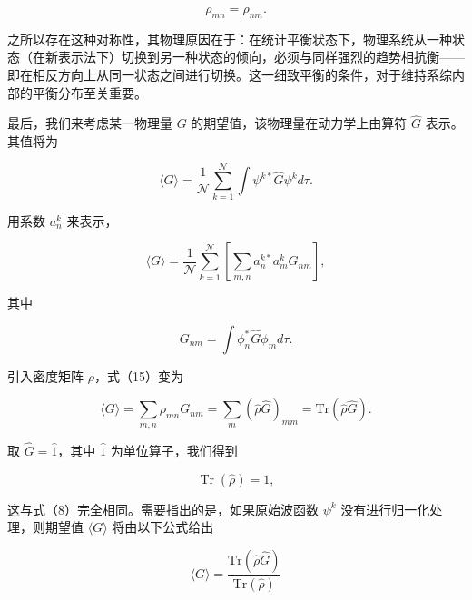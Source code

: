 \begin{equation}\tag{5.1.14}\label{eq:5.1.14}
\rho _ { m n } = \rho _ { n m } .
\end{equation}

之所以存在这种对称性，其物理原因在于：在统计平衡状态下，物理系统从一种状态（在新表示法下）切换到另一种状态的倾向，必须与同样强烈的趋势相抗衡------即在相反方向上从同一状态之间进行切换。这一细致平衡的条件，对于维持系综内部的平衡分布至关重要。

最后，我们来考虑某一物理量 \(G\) 的期望值，该物理量在动力学上由算符 \(\hat{G}\) 表示。其值将为

\begin{equation}\tag{5.1.15}\label{eq:5.1.15}
\langle G \rangle = \frac { 1 } { \mathcal { N } } \sum _ { k = 1 } ^{\mathcal { N} } \int \psi ^{k *} \hat { G } \psi ^{k} d \tau .
\end{equation}

用系数 \(a_{n}^{k}\) 来表示，

\begin{equation}\tag{5.1.16}\label{eq:5.1.16}
\langle G \rangle = \frac { 1 } { \mathcal { N } } \sum _ { k = 1 } ^{\mathcal { N} } \left[ \sum _ { m , n } a _ { n } ^{k *} a _ { m } ^{k} G _ { n m } \right] ,
\end{equation}

其中

\begin{equation}\tag{5.1.17}\label{eq:5.1.17}
G _ { n m } = \int \phi _ { n } ^{*} \hat { G } \phi _ { m } d \tau .
\end{equation}

引入密度矩阵 \(\rho\)，式（15）变为

\begin{equation}\tag{5.1.18}\label{eq:5.1.18}
\langle G \rangle = \sum _ { m , n } \rho _ { m n } G _ { n m } = \sum _ { m } ( \hat { \rho } \hat { G } ) _ { m m } = \mathrm { T r } ( \hat { \rho } \hat { G } ) .
\end{equation}

取 \(\hat{G}=\hat{1}\)，其中 \(\hat{1}\) 为单位算子，我们得到

\begin{equation}\tag{5.1.19}\label{eq:5.1.19}
\operatorname { T r } ( { \hat { \rho } } ) = 1 ,
\end{equation}

这与式（8）完全相同。需要指出的是，如果原始波函数 \(\psi^{k}\) 没有进行归一化处理，则期望值 \(\langle G \rangle\) 将由以下公式给出

\begin{equation}\tag{5.1.20}\label{eq:5.1.20}
\langle G \rangle = \frac { \mathrm { T r } ( \hat { \rho } \hat { G } ) } { \mathrm { T r } ( \hat { \rho } ) }
\end{equation}

